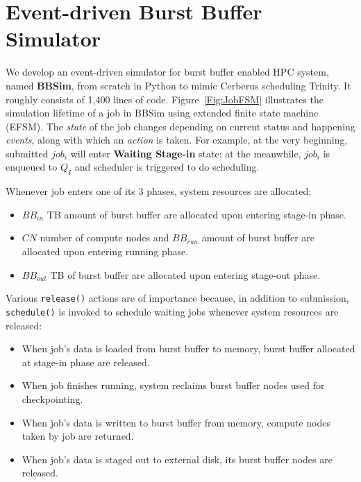 \section{Event-driven Burst Buffer Simulator}

We develop an event-driven simulator for burst buffer enabled HPC system, named \textbf{BBSim},
from scratch in Python to mimic Cerberus scheduling Trinity.
It roughly consists of 1,400 lines of code.
Figure~\ref{Fig:JobFSM} illustrates the simulation lifetime of a job in BBSim
using extended finite state machine (EFSM).
The \textit{state} of the job changes depending on current status and
happening \textit{events}, along with which an \textit{action} is taken.
For example, at the very beginning, submitted $job_i$ will enter \textbf{Waiting Stage-in} state;
at the meanwhile, $job_i$ is enqueued to $Q_I$ and scheduler is triggered to do scheduling.

Whenever job enters one of its 3 phases, system resources are allocated:
\begin{itemize}
        \item $BB_{in}$ TB amount of burst buffer are allocated upon entering stage-in phase.
        \item $CN$ number of compute nodes and $BB_{run}$ amount of burst buffer
                are allocated upon entering running phase.
        \item $BB_{out}$ TB of burst buffer are allocated upon entering stage-out phase.
\end{itemize}
Various \texttt{release()} actions are of importance because, in addition to submission,
\texttt{schedule()} is invoked to schedule waiting jobs
whenever system resources are released:
\begin{itemize}
        \item When job's data is loaded from burst buffer to memory,
                burst buffer allocated at stage-in phase are released.
        \item When job finishes running, system reclaims burst buffer nodes
                used for checkpointing.
        \item When job's data is written to burst buffer from memory,
                compute nodes taken by job are returned.
        \item When job's data is staged out to external disk,
                its burst buffer nodes are released.
\end{itemize}


